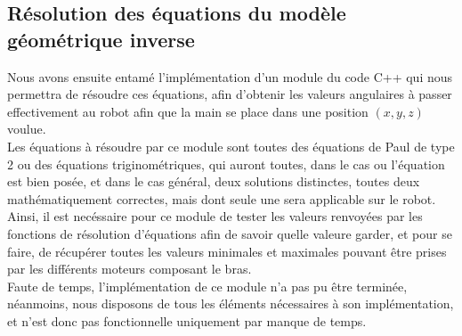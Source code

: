 \subsection{Résolution des équations du modèle géométrique inverse}

Nous avons ensuite entamé l'implémentation d'un module du code C++ qui nous permettra de résoudre ces équations, afin d'obtenir les valeurs angulaires à passer effectivement au robot afin que la main se place dans une position $(x, y, z)$ voulue.\\

Les équations à résoudre par ce module sont toutes des équations de Paul de type 2 ou des équations triginométriques, qui auront toutes, dans le cas ou l'équation est bien posée, et dans le cas général, deux solutions distinctes, toutes deux mathématiquement correctes, mais dont seule une sera applicable sur le robot. Ainsi, il est necéssaire pour ce module de tester les valeurs renvoyées par les fonctions de résolution d'équations afin de savoir quelle valeure garder, et pour se faire, de récupérer toutes les valeurs minimales et maximales pouvant être prises par les différents moteurs composant le bras.\\

Faute de temps, l'implémentation de ce module n'a pas pu être terminée, néanmoins, nous disposons de tous les éléments nécessaires à son implémentation, et n'est donc pas fonctionnelle uniquement par manque de temps.
